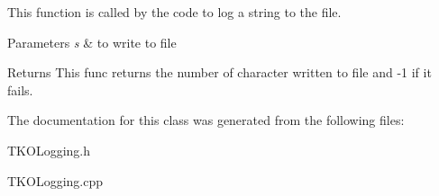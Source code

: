 This function is called by the code to log a string to the file. 


\begin{DoxyParams}{Parameters}
{\em s} & to write to file \\
\hline
\end{DoxyParams}
\begin{DoxyReturn}{Returns}
This func returns the number of character written to file and -\/1 if it fails. 
\end{DoxyReturn}


The documentation for this class was generated from the following files\-:\begin{DoxyCompactItemize}
\item 
T\-K\-O\-Logging.\-h\item 
T\-K\-O\-Logging.\-cpp\end{DoxyCompactItemize}
